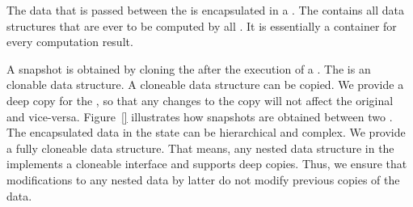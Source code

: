 \documentclass[../ClassicThesis.tex]{subfiles}
\begin{document}

The data that is passed between the  is
encapsulated in a . The
 contains all data structures that are
ever to be computed by all . It is
essentially a container for every computation result.

A snapshot is obtained by cloning the 
after the execution of a . The
 is an clonable data structure. A
cloneable data structure can be copied. We provide a deep
copy for the , so that any changes to
the copy will not affect the original and vice-versa.
Figure~\ref{}  illustrates
how snapshots are obtained between two
. The encapsulated data in the state
can be hierarchical and complex. We provide a fully
cloneable data structure. That means, any nested data
structure in the  implements a
cloneable interface and supports deep copies. Thus, we
ensure that modifications to any nested data by latter
 do not modify previous copies of the
data.




\end{document}
